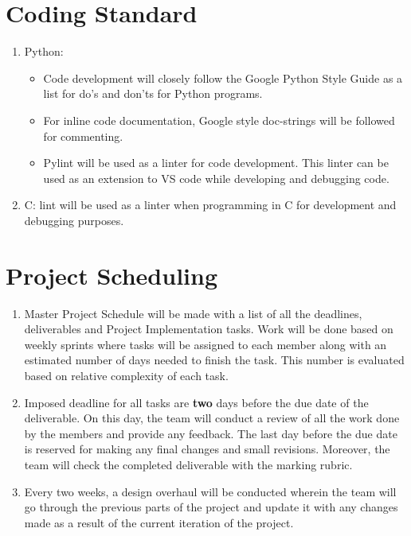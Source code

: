 \documentclass[12pt]{article}
\begin{document}
\pagebreak

\section{Coding Standard}
\begin{enumerate}
\item Python:
\begin{itemize} 
\item Code development will closely follow the Google Python Style Guide as a list for do's and don'ts for Python programs.
\item For inline code documentation, Google style doc-strings will be followed for commenting.
\item Pylint will be used as a linter for code development. This linter can be used as an extension to VS code while developing and debugging code.
\end{itemize}
\item C: lint will be used as a linter when programming in C for development and debugging purposes.
\end{enumerate}

\section{Project Scheduling}

\begin{enumerate}
\item Master Project Schedule will be made with a list of all the deadlines, deliverables and Project Implementation tasks. Work will be done based on weekly sprints where tasks will be assigned to each member along with an estimated number of days needed to finish the task. This number is evaluated based on relative complexity of each task.\\

\item Imposed deadline for all tasks are \textbf{two} days before the due date of the deliverable. On this day, the team will conduct a review of all the work done by the members and provide any feedback. The last day before the due date is reserved for making any final changes and small revisions. Moreover, the team will check the completed deliverable with the marking rubric.\\

\item Every two weeks, a design overhaul will be conducted wherein the team will go through the previous parts of the project and update it with any changes made as a result of the current iteration of the project.\\
\end{enumerate}
\end{document}
